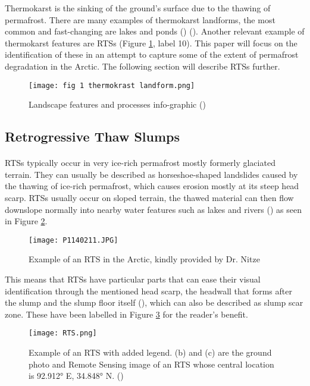 Thermokarst is the sinking of the ground's surface due to the thawing of permafrost. There are many examples of thermokarst landforms, the most common and fast-changing are lakes and ponds (\cite{GROSSE2013325}) (\cite{thawpic}). Another relevant example of thermokarst features are \gls{RTS}s (Figure \ref{fig_thermokrast}, label 10). This paper will focus on the identification of these in an attempt to capture some of the extent of permafrost degradation in the Arctic. The following section will describe \gls{RTS}s further.

    \begin{figure}[hbt!]
        \centering
        \texttt{[image: fig 1 thermokrast landform.png]}
        \caption{Landscape features and processes info-graphic (\cite{rs13061217})}
        \label{fig_thermokrast}
    \end{figure}

\subsection{Retrogressive Thaw Slumps}  \label{rts_intro}
\paragraph{}
\gls{RTS}s typically occur in very ice-rich permafrost mostly formerly glaciated terrain. They can usually be described as horseshoe-shaped landslides caused by the thawing of ice-rich permafrost, which causes erosion mostly at its steep head scarp. \gls{RTS}s usually occur on sloped terrain, the thawed material can then flow downslope normally into nearby water features such as lakes and rivers (\cite{articleperma}) as seen in Figure \ref{fig_RTS_big}.

\begin{figure}[hbt!]
    \centering
    \texttt{[image: P1140211.JPG]}
    \caption{Example of an RTS in the Arctic, kindly provided by Dr. Nitze}
    \label{fig_RTS_big}
\end{figure}

 
This means that \gls{RTS}s have particular parts that can ease their visual identification through the mentioned head scarp, the headwall that forms after the slump and the slump floor itself (\cite{LANTUIT200884}), which can also be described as slump scar zone. These have been labelled in Figure \ref{fig_RTS} for the reader's benefit. 

    \begin{figure}[hbt!]
        \centering
        \texttt{[image: RTS.png]}
        \caption{Example of an RTS with added legend. (b) and (c) are the
ground photo and Remote Sensing image of an RTS whose central location is 92.912° E, 34.848° N. (\cite{HUANG2020111534})}
        \label{fig_RTS}
    \end{figure}

